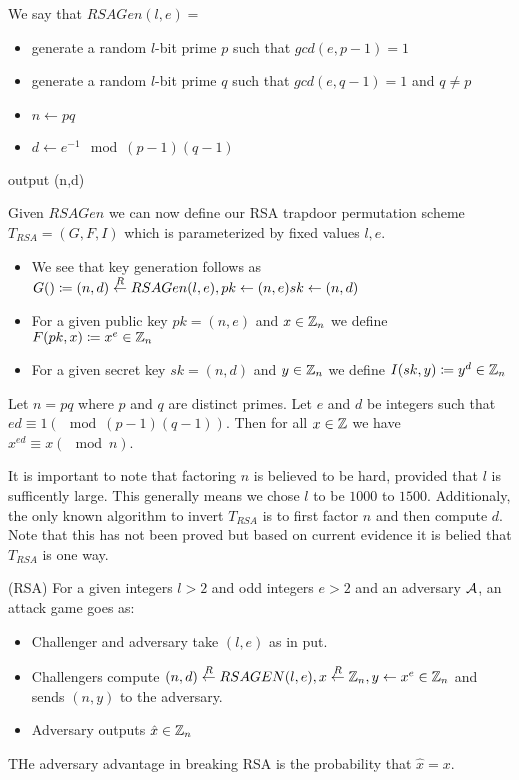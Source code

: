 We say that \(RSAGen(l, e) = \)
\begin{itemize}
    \item generate a random \(l\)-bit prime \(p\) such that \(gcd(e, p-1) = 1\) 
    \item generate a random \(l\)-bit prime \(q\) such that \(gcd(e, q-1) = 1 \) and \(q \neq p\)
    \item \( n \gets pq\)
    \item \( d \gets e^{-1} \mod (p-1)(q-1)\)
          
\end{itemize}
output (n,d)

Given \(RSAGen\) we can now define our RSA trapdoor permutation scheme \(T_{RSA} = (G,F,I)\) which is parameterized by fixed values \(l, e\). 

\begin{itemize}
\item We see that key generation follows as \(G() \coloneqq  (n,d) \overset{R}{\gets} RSAGen(l, e), pk \gets (n,e) sk \gets (n,d) \) 
\item For a given public key \(pk = (n,e)\) and \(x \in \mathbb{Z}_n\) we define \(F(pk, x ) \coloneqq x^e \in \mathbb{Z}_n\)
\item For a given secret key  \(sk = (n,d)\) and \(y \in \mathbb{Z}_n\) we define \(I(sk, y) \coloneqq  y^d \in \mathbb{Z}_n\)   
\end{itemize}


\begin{theorem}
    Let \(n=pq\) where \(p\) and \(q\) are distinct primes. Let \(e \) and \(d\) be integers such that \(ed \equiv 1 (\mod (p-1)(q-1))\). Then for all \(x \in \mathbb{Z}\) we have \(x^{ed} \equiv x (\mod n)\).        
\end{theorem}

It is important to note that factoring \(n\) is believed to be hard, provided that \(l\) is sufficently large. This generally means we chose \(l\) to be \(1000\) to \(1500\).  Additionaly, the only known algorithm to invert \(T_{RSA}\) is to first factor \(n\) and then compute \(d\). Note that this has not been proved but based on current evidence it is belied that \(T_{RSA}\) is one way.          

\begin{attackGame} (RSA)
    For a given integers \(l > 2\) and odd integers \(e > 2\) and an adversary \(\mathcal{A}\), an attack game goes as: 
    \begin{itemize}
        \item Challenger and adversary take \((l,e)\) as in put.
        \item Challengers compute \((n,d) \overset{R}{\gets} RSAGEN(l,e), x \overset{R}{\gets} \mathbb{Z}_n, y \gets x^e \in \mathbb{Z}_n\) and sends \((n,y)\) to the adversary. 
        \item Adversary outputs \(\hat{x} \in \mathbb{Z}_n\)     
    \end{itemize}
    THe adversary advantage in breaking RSA is the probability that \(\hat{x} = x\). 
\end{attackGame}

